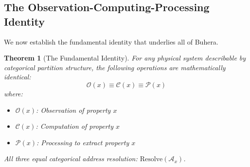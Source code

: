 \documentclass[twocolumn,10pt]{article}
\newtheorem{theorem}{Theorem}[section]
\theoremstyle{definition}
\theoremstyle{remark}
\newcommand{\cataddr}{\mathcal{A}}
\begin{document}
\subsection{The Observation-Computing-Processing Identity}

We now establish the fundamental identity that underlies all of Buhera.

\begin{theorem}[The Fundamental Identity]
\label{thm:fundamental}
For any physical system describable by categorical partition structure, the following operations are mathematically identical:
\begin{equation}
    \mathcal{O}(x) \equiv \mathcal{C}(x) \equiv \mathcal{P}(x)
\end{equation}
where:
\begin{itemize}
    \item $\mathcal{O}(x)$: Observation of property $x$
    \item $\mathcal{C}(x)$: Computation of property $x$
    \item $\mathcal{P}(x)$: Processing to extract property $x$
\end{itemize}
All three equal categorical address resolution: $\text{Resolve}(\cataddr_x)$.
\end{theorem}
\end{document}
